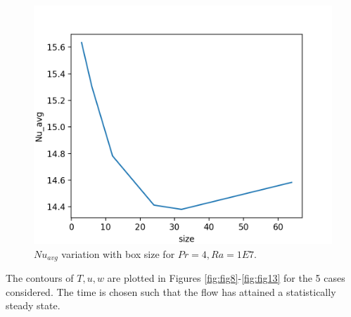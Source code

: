 \documentclass[12pt]{article}
\begin{document}
      \begin{figure}[!htb]
      	\includegraphics[width=\linewidth]{Nu_avg_1E7_4.png}
      	\caption{$Nu_{avg}$ variation with box size for $Pr = 4, Ra = 1E7$.}
      	\label{fig:fig7}
      \end{figure} 
      
      The contours of $T,u,w$ are plotted in Figures \ref{fig:fig8}-\ref{fig:fig13} for the 5 cases considered. The time is chosen such that the flow has attained a statistically steady state.
      
\end{document}
